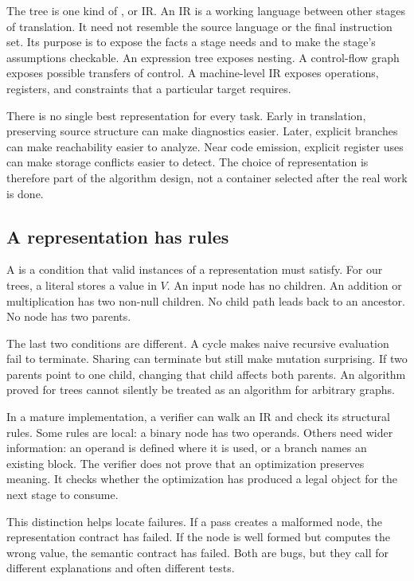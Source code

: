 The tree is one kind of , or IR.
An IR is a working language between other stages of translation.
It need not resemble the source language or the final instruction set.
Its purpose is to expose the facts a stage needs and to make the stage's assumptions checkable.
An expression tree exposes nesting.
A control-flow graph exposes possible transfers of control.
A machine-level IR exposes operations, registers, and constraints that a particular target requires.

There is no single best representation for every task.
Early in translation, preserving source structure can make diagnostics easier.
Later, explicit branches can make reachability easier to analyze.
Near code emission, explicit register uses can make storage conflicts easier to detect.
The choice of representation is therefore part of the algorithm design, not a container selected after the real work is done.

\subsection{A representation has rules}
\label{sec:expression-invariants}

A  is a condition that valid instances of a representation must satisfy.
For our trees, a literal stores a value in $V$.
An input node has no children.
An addition or multiplication has two non-null children.
No child path leads back to an ancestor.
No node has two parents.

The last two conditions are different.
A cycle makes naive recursive evaluation fail to terminate.
Sharing can terminate but still make mutation surprising.
If two parents point to one child, changing that child affects both parents.
An algorithm proved for trees cannot silently be treated as an algorithm for arbitrary graphs.

In a mature implementation, a verifier can walk an IR and check its structural rules.
Some rules are local: a binary node has two operands.
Others need wider information: an operand is defined where it is used, or a branch names an existing block.
The verifier does not prove that an optimization preserves meaning.
It checks whether the optimization has produced a legal object for the next stage to consume.

This distinction helps locate failures.
If a pass creates a malformed node, the representation contract has failed.
If the node is well formed but computes the wrong value, the semantic contract has failed.
Both are bugs, but they call for different explanations and often different tests.

